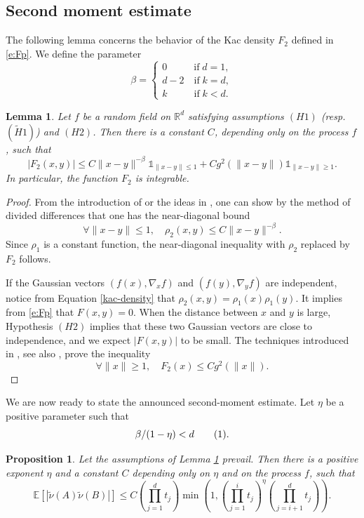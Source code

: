 \documentclass[11pt,a4paper]{article}
\newcommand\R{\mathbb{R}}
\newcommand\E{\mathbb{E}}
\newcommand\nut{\tilde{\nu}}
\newcommand\one{\mathds{1}}
\newcommand\numberthis{\addtocounter{equation}{1}\tag{\theequation}}
\newcommand\jump{\par\medskip}
\numberwithin{equation}{section}
\theoremstyle{plain}
\theoremstyle{plain}
\theoremstyle{plain}
\newtheorem{lemm}[theo]{Lemma}
\newenvironment{lemma}%
  {\begin{mdframed}[backgroundcolor=white]\begin{lemm}}%
  {\end{lemm}\par\vspace{0.cm}\end{mdframed}}
\theoremstyle{plain}
\newtheorem{prop}[theo]{Proposition}
\newenvironment{proposition}%
  {\begin{mdframed}[backgroundcolor=white]\begin{prop}}%
  {\end{prop}\par\vspace{0.cm}\end{mdframed}}
\theoremstyle{definition}
\theoremstyle{definition}
\begin{document}
\subsection{Second moment estimate}
The following lemma concerns the behavior of the Kac density $F_2$ defined in \eqref{e:Fp}. We define the parameter
\[\beta  = \left\lbrace\begin{array}{llll}
0 \qquad\;\;\,\text{if}\; d=1,\\
d-2 \quad\text{if}\;k=d,\\
k \qquad\;\;\,\text{if}\;k<d.
\end{array}\right.\]
\begin{lemma}
\label{lem3}
Let $f$ be a random field on $\R^d$ satisfying assumptions  $(H1)$ (resp. $(\widetilde{H}1)$) and $(H2)$. Then there is a constant $C$, depending only on the process $f$, such that
\[|F_2(x,y)|\leq C\|x-y\|^{-\beta}\one_{\|x-y\|\leq 1} + Cg^2(\|x-y\|)\one_{\|x-y\|\geq 1}.\]
In particular, the function $F_2$ is integrable.
\end{lemma}
\begin{proof}
From the introduction of \cite{Gas23} or the ideas in \cite{Gas21b}, one can show by the method of divided differences that one has the near-diagonal bound
\[\forall \|x-y\|\leq 1,\quad \rho_2(x,y)\leq C\|x-y\|^{-\beta}.\]
Since $\rho_1$ is a constant function, the near-diagonal inequality with $\rho_2$ replaced by $F_2$ follows.\jump

If the Gaussian vectors $(f(x), \nabla_x f)$ and $(f(y),\nabla_y f)$ are independent, notice from Equation \ref{kac-density} that $\rho_2(x,y) = \rho_1(x)\rho_1(y)$. It implies from \eqref{e:Fp} that $F(x,y) = 0$. When the distance between $x$ and $y$ is large, Hypothesis $(H2)$ implies that these two Gaussian vectors are close to independence, and we expect $|F(x,y)|$ to be small. The techniques introduced in \cite{Gas21b}, see also \cite[Lemma 8.2]{Anc24}, prove the inequality
\[\forall \|x\|\geq 1,\quad F_2(x)\leq C g^2(\|x\|).\]
\end{proof} 
We are now ready to state the announced second-moment estimate. Let $\eta$ be a positive parameter such that 
\[\beta/(1-\eta)<d\numberthis\label{eq:07}.\]
\begin{proposition}
\label{prop1}
 Let the assumptions of Lemma \ref{lem3} prevail. Then there is a positive exponent $\eta$ and a constant $C$ depending only on $\eta$ and on the process $f$, such that
\[\E[|\nut(A)\nut(B)|]\leq C\left(\prod_{j=1}^d t_j\right)\min\left(1, \left(\prod_{j=1}^i t_j\right)^{\eta}\left(\prod_{j=i+1}^d t_j\right)\right).\]
\end{proposition}
\end{document}
